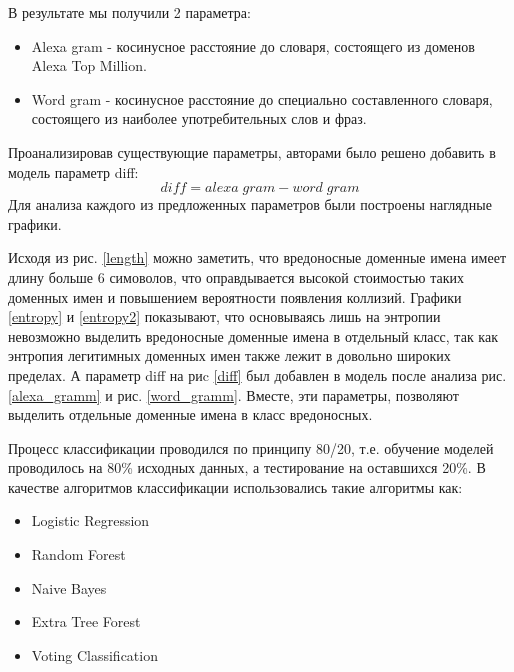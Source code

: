     В результате мы получили 2 параметра:
    \begin{itemize}
    \item Alexa gram - косинусное расстояние до словаря, состоящего из доменов Alexa Top Million.
    \item Word gram - косинусное расстояние до специально составленного словаря, состоящего из наиболее употребительных слов и фраз.
    \end{itemize}
    Проанализировав существующие параметры, авторами было решено добавить в модель параметр diff:
    \begin{equation}
    diff = alexa\;gram-word\;gram
    \end{equation}
    Для анализа каждого из предложенных параметров были построены наглядные графики.

    Исходя из рис. \ref{length} можно заметить, что вредоносные доменные имена имеет длину больше 6 симоволов, что оправдывается высокой стоимостью таких доменных имен и повышением вероятности появления коллизий.
    Графики \ref{entropy} и \ref{entropy2} показывают, что основываясь лишь на энтропии невозможно выделить вредоносные доменные имена в отдельный класс, так как энтропия легитимных доменных имен также лежит в довольно широких пределах. А параметр diff на риc \ref{diff} был добавлен в модель после анализа рис. \ref{alexa_gramm} и рис. \ref{word_gramm}. Вместе, эти параметры, позволяют выделить отдельные доменные имена в класс вредоносных.

    Процесс классификации проводился по принципу 80/20, т.е. обучение моделей проводилось на 80\% исходных данных, а тестирование на оставшихся 20\%. В качестве алгоритмов классификации использовались такие алгоритмы как:
    \begin{itemize}
    \item Logistic Regression
    \item Random Forest
    \item Naive Bayes
    \item Extra Tree Forest
    \item Voting Classification
    \end{itemize}

